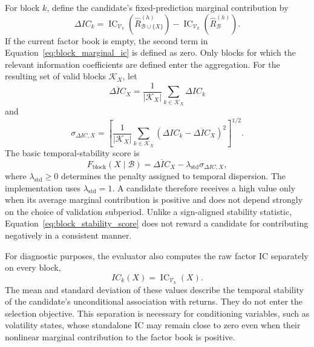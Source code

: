 For block \(k\), define the candidate's fixed-prediction marginal contribution by
\begin{equation}
    \Delta IC_k
    =
    \operatorname{IC}_{\mathcal V_k}
    \left(
        \widehat R^{(h)}_{\mathcal B\cup\{X\}}
    \right)
    -
    \operatorname{IC}_{\mathcal V_k}
    \left(
        \widehat R^{(h)}_{\mathcal B}
    \right).
    \label{eq:block_marginal_ic}
\end{equation}
If the current factor book is empty, the second term in
Equation~\eqref{eq:block_marginal_ic} is defined as zero. Only blocks for which
the relevant information coefficients are defined enter the aggregation. For
the resulting set of valid blocks \(\mathcal K_X\), let
\[
    \overline{\Delta IC}_X
    =
    \frac{1}{|\mathcal K_X|}
    \sum_{k\in\mathcal K_X}\Delta IC_k
\]
and
\[
    \sigma_{\Delta IC,X}
    =
    \left[
        \frac{1}{|\mathcal K_X|}
        \sum_{k\in\mathcal K_X}
        \left(
            \Delta IC_k-\overline{\Delta IC}_X
        \right)^2
    \right]^{1/2}.
\]
The basic temporal-stability score is
\begin{equation}
    F_{\mathrm{block}}
    \left(
        X\mid\mathcal B
    \right)
    =
    \overline{\Delta IC}_X
    -
    \lambda_{\mathrm{std}}\sigma_{\Delta IC,X},
    \label{eq:block_stability_score}
\end{equation}
where \(\lambda_{\mathrm{std}}\geq0\) determines the penalty assigned to temporal
dispersion. The implementation uses \(\lambda_{\mathrm{std}}=1\). A candidate
therefore receives a high value only when its average marginal contribution is
positive and does not depend strongly on the choice of validation subperiod.
Unlike a sign-aligned stability statistic, Equation~\eqref{eq:block_stability_score}
does not reward a candidate for contributing negatively in a consistent manner.

For diagnostic purposes, the evaluator also computes the raw factor IC separately
on every block,
\[
    IC_k(X)
    =
    \operatorname{IC}_{\mathcal V_k}(X).
\]
The mean and standard deviation of these values describe the temporal stability
of the candidate's unconditional association with returns. They do not enter the
selection objective. This separation is necessary for conditioning variables,
such as volatility states, whose standalone IC may remain close to zero even when
their nonlinear marginal contribution to the factor book is positive.

